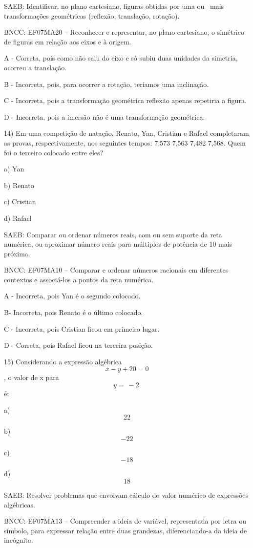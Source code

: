 SAEB: Identificar, no plano cartesiano, figuras obtidas por uma ou~ mais
transformações geométricas (reflexão, translação, rotação).

BNCC: EF07MA20 -- Reconhecer e representar, no plano cartesiano, o
simétrico de figuras em relação aos eixos e à origem.

A - Correta, pois como não saiu do eixo e só subiu duas unidades da
simetria, ocorreu a translação.

B - Incorreta, pois, para ocorrer a rotação, teríamos uma inclinação.

C - Incorreta, pois a transformação geométrica reflexão apenas repetiria
a figura.

D - Incorreta, pois a imersão não é uma transformação geométrica.

14) Em uma competição de natação, Renato, Yan, Cristian e Rafael
completaram as provas, respectivamente, nos seguintes tempos: 7,573
7,563 7,482 7,568. Quem foi o terceiro colocado entre eles?

a) Yan

b) Renato

c) Cristian

d) Rafael

SAEB: Comparar ou ordenar números reais, com ou sem suporte da reta
numérica, ou aproximar número reais para múltiplos de potência de 10
mais próxima.

BNCC: EF07MA10 -- Comparar e ordenar números racionais em diferentes
contextos e associá-los a pontos da reta numérica.

A - Incorreta, pois Yan é o segundo colocado.

B- Incorreta, pois Renato é o último colocado.

C - Incorreta, pois Cristian ficou em primeiro lugar.

D - Correta, pois Rafael ficou na terceira posição.

15) Considerando a expressão algébrica \[x - y + 20 = 0\], o valor de x
para \[y = \  - 2\ \]é:

a) \[22\]

b) \[- 22\]

c) \[- 18\]

d) \[18\]

SAEB: Resolver problemas que envolvam cálculo do valor numérico de
expressões algébricas.

BNCC: EF07MA13 -- Compreender a ideia de variável, representada por
letra ou símbolo, para expressar relação entre duas grandezas,
diferenciando-a da ideia de incógnita.

